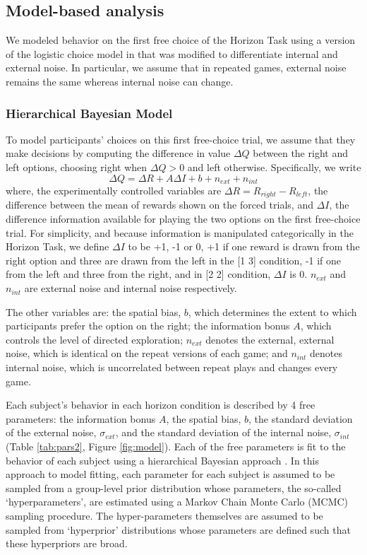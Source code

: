 \documentclass[12pt]{article}
\begin{document}
	
	\subsection*{Model-based analysis}
	We modeled behavior on the first free choice of the Horizon Task using a version of the logistic choice model in \citep{wilson2014} that was modified to differentiate internal and external noise. In particular, we assume that in repeated games, external noise remains the same whereas internal noise can change. 
	
	\subsubsection*{Hierarchical Bayesian Model}
	
	To model participants' choices on this first free-choice trial, we assume that they make decisions by computing the difference in value $\Delta Q$ between the right and left options, choosing right when $\Delta Q > 0$ and left otherwise.  Specifically, we write
	\begin{equation}
	\Delta Q= \Delta R+A \Delta    I+b+n_{ext}+n_{int}
	\end{equation}
	where, the experimentally controlled variables are $\Delta R=R_{right}-R_{left}$, the difference between the mean of rewards shown on the forced trials, and $\Delta I$, the difference information available for playing the two options on the first free-choice trial. For simplicity, and because information is manipulated categorically in the Horizon Task, we define $\Delta I$ to be +1, -1 or 0, +1 if one reward is drawn from the right option and three are drawn from the left in the [1 3] condition, -1 if one from the left and three from the right, and in [2 2] condition, $\Delta I$ is 0. $n_{ext}$ and $n_{int}$ are external noise and internal noise respectively. 
	
	The other variables are: the spatial bias, $b$, which determines the extent to which participants prefer the option on the right; the information bonus $A$, which controls the level of directed exploration; $n_{ext}$ denotes the external, external noise, which is identical on the repeat versions of each game; and $n_{int}$ denotes internal noise, which is uncorrelated between repeat plays and changes every game.
	
	Each subject's behavior in each horizon condition is described by 4 free parameters: the information bonus $A$, the spatial bias, $b$, the standard deviation of the external noise, $\sigma_{ext}$, and the standard deviation of the internal noise, $\sigma_{int}$ (Table \ref{tab:pars2}, Figure \ref{fig:model}). Each of the free parameters is fit to the behavior of each subject using a hierarchical Bayesian approach \citep{hbm1}.  In this approach to model fitting, each parameter for each subject is assumed to be sampled from a group-level prior distribution whose parameters, the so-called `hyperparameters', are estimated using a Markov Chain Monte Carlo (MCMC) sampling procedure. The hyper-parameters themselves are assumed to be sampled from `hyperprior' distributions whose parameters are defined such that these hyperpriors are broad.  
	
\end{document}

